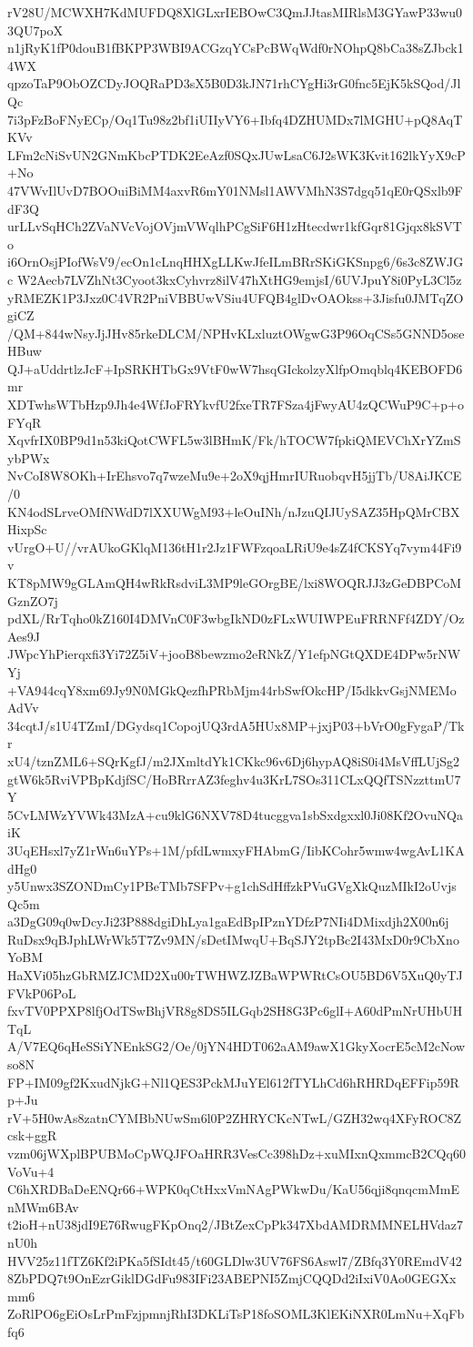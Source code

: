 rV28U/MCWXH7KdMUFDQ8XlGLxrIEBOwC3QmJJtasMIRlsM3GYawP33wu03QU7poX
n1jRyK1fP0douB1fBKPP3WBI9ACGzqYCsPcBWqWdf0rNOhpQ8bCa38sZJbck14WX
qpzoTaP9ObOZCDyJOQRaPD3sX5B0D3kJN71rhCYgHi3rG0fnc5EjK5kSQod/JlQc
7i3pFzBoFNyECp/Oq1Tu98z2bf1iUIIyVY6+Ibfq4DZHUMDx7lMGHU+pQ8AqTKVv
LFm2cNiSvUN2GNmKbcPTDK2EeAzf0SQxJUwLsaC6J2sWK3Kvit162lkYyX9cP+No
47VWvIlUvD7BOOuiBiMM4axvR6mY01NMsl1AWVMhN3S7dgq51qE0rQSxlb9FdF3Q
urLLvSqHCh2ZVaNVcVojOVjmVWqlhPCgSiF6H1zHtecdwr1kfGqr81Gjqx8kSVTo
i6OrnOsjPIofWsV9/ecOn1cLnqHHXgLLKwJfeILmBRrSKiGKSnpg6/6s3c8ZWJGc
W2Aecb7LVZhNt3Cyoot3kxCyhvrz8ilV47hXtHG9emjsI/6UVJpuY8i0PyL3Cl5z
yRMEZK1P3Jxz0C4VR2PniVBBUwVSiu4UFQB4glDvOAOkss+3Jisfu0JMTqZOgiCZ
/QM+844wNsyJjJHv85rkeDLCM/NPHvKLxluztOWgwG3P96OqCSs5GNND5oseHBuw
QJ+aUddrtlzJcF+IpSRKHTbGx9VtF0wW7hsqGIckolzyXlfpOmqblq4KEBOFD6mr
XDTwhsWTbHzp9Jh4e4WfJoFRYkvfU2fxeTR7FSza4jFwyAU4zQCWuP9C+p+oFYqR
XqvfrIX0BP9d1n53kiQotCWFL5w3lBHmK/Fk/hTOCW7fpkiQMEVChXrYZmSybPWx
NvCoI8W8OKh+IrEhsvo7q7wzeMu9e+2oX9qjHmrIURuobqvH5jjTb/U8AiJKCE/0
KN4odSLrveOMfNWdD7lXXUWgM93+leOuINh/nJzuQIJUySAZ35HpQMrCBXHixpSc
vUrgO+U//vrAUkoGKlqM136tH1r2Jz1FWFzqoaLRiU9e4sZ4fCKSYq7vym44Fi9v
KT8pMW9gGLAmQH4wRkRsdviL3MP9leGOrgBE/lxi8WOQRJJ3zGeDBPCoMGznZO7j
pdXL/RrTqho0kZ160I4DMVnC0F3wbgIkND0zFLxWUIWPEuFRRNFf4ZDY/OzAes9J
JWpcYhPierqxfi3Yi72Z5iV+jooB8bewzmo2eRNkZ/Y1efpNGtQXDE4DPw5rNWYj
+VA944cqY8xm69Jy9N0MGkQezfhPRbMjm44rbSwfOkcHP/I5dkkvGsjNMEMoAdVv
34cqtJ/s1U4TZmI/DGydsq1CopojUQ3rdA5HUx8MP+jxjP03+bVrO0gFygaP/Tkr
xU4/tznZML6+SQrKgfJ/m2JXmltdYk1CKkc96v6Dj6hypAQ8iS0i4MsVffLUjSg2
gtW6k5RviVPBpKdjfSC/HoBRrrAZ3feghv4u3KrL7SOs311CLxQQfTSNzzttmU7Y
5CvLMWzYVWk43MzA+cu9klG6NXV78D4tucggva1sbSxdgxxl0Ji08Kf2OvuNQaiK
3UqEHsxl7yZ1rWn6uYPs+1M/pfdLwmxyFHAbmG/IibKCohr5wmw4wgAvL1KAdHg0
y5Unwx3SZONDmCy1PBeTMb7SFPv+g1chSdHffzkPVuGVgXkQuzMIkI2oUvjsQc5m
a3DgG09q0wDcyJi23P888dgiDhLya1gaEdBpIPznYDfzP7NIi4DMixdjh2X00n6j
RuDsx9qBJphLWrWk5T7Zv9MN/sDetIMwqU+BqSJY2tpBc2I43MxD0r9CbXnoYoBM
HaXVi05hzGbRMZJCMD2Xu00rTWHWZJZBaWPWRtCsOU5BD6V5XuQ0yTJFVkP06PoL
fxvTV0PPXP8lfjOdTSwBhjVR8g8DS5ILGqb2SH8G3Pc6glI+A60dPmNrUHbUHTqL
A/V7EQ6qHeSSiYNEnkSG2/Oe/0jYN4HDT062aAM9awX1GkyXocrE5cM2cNowso8N
FP+IM09gf2KxudNjkG+Nl1QES3PckMJuYEl612fTYLhCd6hRHRDqEFFip59Rp+Ju
rV+5H0wAs8zatnCYMBbNUwSm6l0P2ZHRYCKcNTwL/GZH32wq4XFyROC8Zcsk+ggR
vzm06jWXplBPUBMoCpWQJFOaHRR3VesCc398hDz+xuMIxnQxmmcB2CQq60VoVu+4
C6hXRDBaDeENQr66+WPK0qCtHxxVmNAgPWkwDu/KaU56qji8qnqcmMmEnMWm6BAv
t2ioH+nU38jdI9E76RwugFKpOnq2/JBtZexCpPk347XbdAMDRMMNELHVdaz7nU0h
HVV25z11fTZ6Kf2iPKa5fSIdt45/t60GLDlw3UV76FS6Aswl7/ZBfq3Y0REmdV42
8ZbPDQ7t9OnEzrGiklDGdFu983IFi23ABEPNI5ZmjCQQDd2iIxiV0Ao0GEGXxmm6
ZoRlPO6gEiOsLrPmFzjpmnjRhI3DKLiTsP18foSOML3KlEKiNXR0LmNu+XqFbfq6
